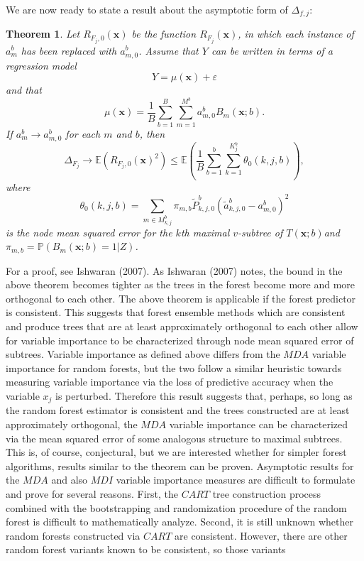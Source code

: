 \documentclass[12pt,twoside]{reedthesis}
\newtheorem{theorem}{Theorem}[chapter]
\theoremstyle{definition}
\theoremstyle{definition}
\theoremstyle{definition}
\theoremstyle{remark}
\begin{document}
We are now ready to state a result about the asymptotic form of
\(\Delta_{f,j}\):
\begin{theorem}
Let $R_{F_j, 0}(\mathbf{x})$ be the function $R_{F_j}(\mathbf{x})$, in which each instance of $a_m^b$ has been replaced with $a_{m,0}^b$. Assume that $Y$ can be written in terms of a regression model $$Y=\mu(\mathbf{x})+\varepsilon$$ and that $$\mu(\mathbf{x})=\frac{1}{B}\sum_{b=1}^B\sum_{m=1}^{M^b}a_{m,0}^b B_m(\mathbf{x};b).$$ If $a_m^b\rightarrow a_{m,0}^b$ for each $m$ and $b$, then $$\Delta_{F_j}\rightarrow \mathbb{E}\left(R_{F_j,0}(\mathbf{x})^2\right)\leq\mathbb{E}\left(\frac{1}{B}\sum_{b=1}^b\sum_{k=1}^{K_j^b}\theta_0(k,j,b)\right),$$ where $$\theta_0(k,j,b)=\sum_{m\in M_{k,j}^b} \pi_{m,b}\tilde{P}_{k,j,0}^b\left(\tilde{a}_{k,j,0}^b-a_{m,0}^b\right)^2$$ is the node mean squared error for the $k$th maximal $v$-subtree of $T(\mathbf{x};b)$and $\pi_{m,b}=\mathbb{P}(B_m(\mathbf{x};b)=1|Z)$. 
\end{theorem}
For a proof, see Ishwaran (2007). As Ishwaran (2007) notes, the bound in
the above theorem becomes tighter as the trees in the forest become more
and more orthogonal to each other. The above theorem is applicable if
the forest predictor is consistent. This suggests that forest ensemble
methods which are consistent and produce trees that are at least
approximately orthogonal to each other allow for variable importance to
be characterized through node mean squared error of subtrees. Variable
importance as defined above differs from the \(MDA\) variable importance
for random forests, but the two follow a similar heuristic towards
measuring variable importance via the loss of predictive accuracy when
the variable \(x_j\) is perturbed. Therefore this result suggests that,
perhaps, so long as the random forest estimator is consistent and the
trees constructed are at least approximately orthogonal, the \(MDA\)
variable importance can be characterized via the mean squared error of
some analogous structure to maximal subtrees. This is, of course,
conjectural, but we are interested whether for simpler forest
algorithms, results similar to the theorem can be proven. Asymptotic
results for the \(MDA\) and also \(MDI\) variable importance measures
are difficult to formulate and prove for several reasons. First, the
\(CART\) tree construction process combined with the bootstrapping and
randomization procedure of the random forest is difficult to
mathematically analyze. Second, it is still unknown whether random
forests constructed via \(CART\) are consistent. However, there are
other random forest variants known to be consistent, so those variants
\end{document}

